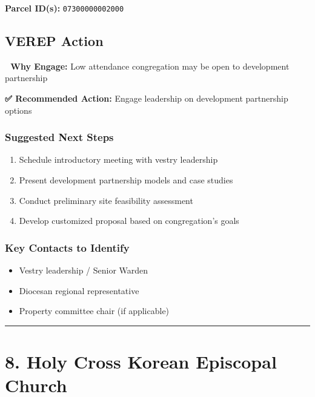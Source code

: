 \documentclass[
  letterpaper,
  DIV=11,
  numbers=noendperiod,
  oneside]{scrreprt}
\providecommand{\tightlist}{%
  \setlength{\itemsep}{0pt}\setlength{\parskip}{0pt}}
\begin{document}
\textbf{Parcel ID(s):} \texttt{07300000002000}

\subsection{VEREP Action}

\textbf{🎯 Why Engage:} Low attendance congregation may be open to
development partnership

\textbf{✅ Recommended Action:} Engage leadership on development
partnership options

\subsubsection{Suggested Next Steps}\label{suggested-next-steps-6}

\begin{enumerate}
\def\labelenumi{\arabic{enumi}.}
\tightlist
\item
  Schedule introductory meeting with vestry leadership
\item
  Present development partnership models and case studies
\item
  Conduct preliminary site feasibility assessment
\item
  Develop customized proposal based on congregation's goals
\end{enumerate}

\subsubsection{Key Contacts to
Identify}\label{key-contacts-to-identify-6}

\begin{itemize}
\tightlist
\item[$\square$]
  Vestry leadership / Senior Warden
\item[$\square$]
  Diocesan regional representative
\item[$\square$]
  Property committee chair (if applicable)
\end{itemize}

\begin{center}\rule{0.5\linewidth}{0.5pt}\end{center}

\section*{8. Holy Cross Korean Episcopal
Church}\label{holy-cross-korean-episcopal-church}
\end{document}
